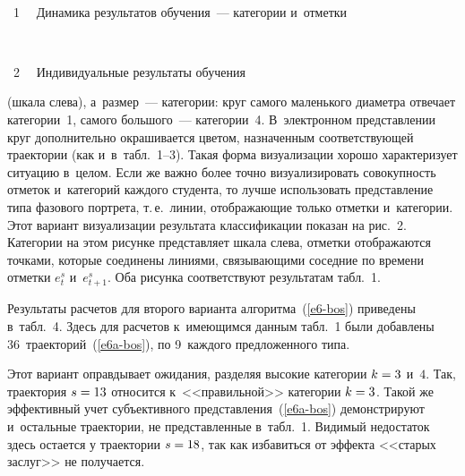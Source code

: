 \begin{multicols}{2}
{ \begin{center}  %
 \vspace*{12pt}
    \mbox{%
\epsfxsize=79mm
}

\end{center}

\vspace*{-2pt}

\noindent
{{\figurename~1}\ \ \small{
Динамика результатов обучения~--- категории и~отметки
}}}


{ \begin{center}  %
 \vspace*{-3pt}
     \mbox{%
\epsfxsize=77.444mm
}

\vspace*{6pt}

\noindent
{{\figurename~2}\ \ \small{
Индивидуальные результаты обучения
}}\end{center}
}

\vspace*{9pt}

\noindent
 (шкала слева), а~размер~--- 
категории: круг самого маленького диаметра отвечает категории~1, самого 
большого~--- категории~4. В~электронном представлении круг 
дополнительно окрашивается цветом, назначенным соответствующей 
траектории (как и~в~табл.~1--3). Такая форма визуализации хорошо 
характеризует ситуацию в~целом. Если же важно более точно 
визуализировать совокупность отметок и~категорий каждого студента, то 
лучше использовать представление типа фазового портрета, т.\,е.\ линии, 
отображающие только отметки и~категории. Этот вариант визуализации 
результата классификации показан на рис.~2. Категории на этом рисунке 
представляет шкала слева, отметки отображаются точками, которые 
соединены линиями, свя\-зы\-ва\-ющи\-ми соседние по времени отметки $e_t^s$ 
и~$e^s_{t+1}$. Оба рисунка соответствуют результатам табл.~1.





     Результаты расчетов для второго варианта алгоритма~(\ref{e6-bos}) 
приведены в~табл.~4. Здесь для расчетов к~имеющимся данным табл.~1 были 
добавлены 36~траекторий~(\ref{e6a-bos}), по 9~каждого предложенного типа.
     

     
     Этот вариант оправдывает ожидания, разделяя высокие категории 
$k\hm= 3$ и~$4$. Так, траектория $s\hm=13$ относится к~<<правильной>> 
категории $k\hm=3$. Такой же эффективный учет субъективного 
представления~(\ref{e6a-bos}) демонстрируют и~остальные траектории, не 
представленные в~табл.~1. Видимый недостаток здесь остается у траектории 
$s\hm=18$, так как избавиться от эффекта <<старых заслуг>> не получается.


\end{multicols}
